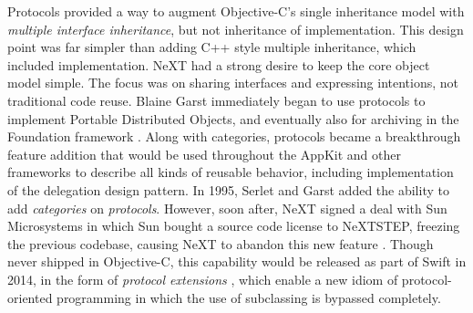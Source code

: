 \documentclass[acmsmall,screen]{acmart}
\begin{document}
Protocols provided a way to augment Objective-C's single inheritance model with \emph{multiple interface inheritance}, but not inheritance of implementation. This design point was far simpler than adding C++ style multiple inheritance, which included implementation. NeXT had a strong desire to keep the core object model simple. The focus was on sharing interfaces and expressing intentions, not traditional code reuse. Blaine Garst immediately began to use protocols to implement Portable Distributed Objects, and eventually also for archiving in the Foundation framework \citep[54--55]{garst_oral_2016}. Along with categories, protocols became a breakthrough feature addition that would be used throughout the AppKit and other frameworks to describe all kinds of reusable behavior, including implementation of the delegation design pattern. In 1995, Serlet and Garst added the ability to add \emph{categories} on \emph{protocols}. However, soon after, NeXT signed a deal with Sun Microsystems in which Sun bought a source code license to NeXTSTEP, freezing the previous codebase, causing NeXT to abandon this new feature \citep[60--61]{garst_oral_2016}. Though never shipped in Objective-C, this capability would be released as part of Swift in 2014, in the form of \emph{protocol extensions} , which enable a new idiom of protocol-oriented programming in which the use of subclassing is bypassed completely.
\end{document}
